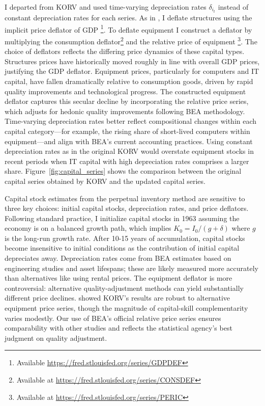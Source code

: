 \documentclass[12pt]{article}
\begin{document}
I departed from KORV and used time-varying depreciation rates $\delta_{i_t}$ instead of constant depreciation rates for each series. As in \citep{ohanian2021revisiting}, I deflate structures using the implicit price deflator of GDP \footnote{Available \url{https://fred.stlouisfed.org/series/GDPDEF}}. To deflate equipment I construct a deflator by multiplying the consumption deflator\footnote{Available at \url{https://fred.stlouisfed.org/series/CONSDEF}} and the relative price of equipment \footnote{Available at \url{https://fred.stlouisfed.org/series/PERIC}}. The choice of deflators reflects the differing price dynamics of these capital types. Structures prices have historically moved roughly in line with overall GDP prices, justifying the GDP deflator. Equipment prices, particularly for computers and IT capital, have fallen dramatically relative to consumption goods, driven by rapid quality improvements and technological progress. The constructed equipment deflator captures this secular decline by incorporating the relative price series, which adjusts for hedonic quality improvements following BEA methodology. Time-varying depreciation rates better reflect compositional changes within each capital category---for example, the rising share of short-lived computers within equipment---and align with BEA's current accounting practices. Using constant depreciation rates as in the original KORV would overstate equipment stocks in recent periods when IT capital with high depreciation rates comprises a larger share. Figure~\ref{fig:capital_series} shows the comparison between the original capital series obtained by KORV and the updated capital series.

Capital stock estimates from the perpetual inventory method are sensitive to three key choices: initial capital stocks, depreciation rates, and price deflators. Following standard practice, I initialize capital stocks in 1963 assuming the economy is on a balanced growth path, which implies $K_0 = I_0 / (g + \delta)$ where $g$ is the long-run growth rate. After 10-15 years of accumulation, capital stocks become insensitive to initial conditions as the contribution of initial capital depreciates away. Depreciation rates come from BEA estimates based on engineering studies and asset lifespans; these are likely measured more accurately than alternatives like using rental prices. The equipment deflator is more controversial: alternative quality-adjustment methods can yield substantially different price declines. \citet{polred2008capital} showed KORV's results are robust to alternative equipment price series, though the magnitude of capital-skill complementarity varies modestly. Our use of BEA's official relative price series ensures comparability with other studies and reflects the statistical agency's best judgment on quality adjustment.
\end{document}

